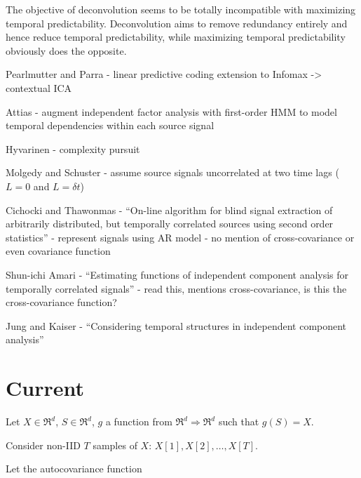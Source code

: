 \documentclass{article}
\begin{document}
  The objective of deconvolution seems to be totally incompatible with maximizing temporal predictability. Deconvolution aims to remove redundancy entirely and hence reduce temporal predictability, while maximizing temporal predictability obviously does the opposite.

  Pearlmutter and Parra - linear predictive coding extension to Infomax -> contextual ICA

  Attias - augment independent factor analysis with first-order HMM to model temporal dependencies within each source signal

  Hyvarinen - complexity pursuit

  Molgedy and Schuster - assume source signals uncorrelated at two time lags ($L=0$ and $L=\delta t$)

  Cichocki and Thawonmas - ``On-line algorithm for blind signal extraction of arbitrarily distributed, but temporally correlated sources using second order statistics'' - represent signals using AR model - no mention of cross-covariance or even covariance function

  Shun-ichi Amari - ``Estimating functions of independent component analysis for temporally correlated signals'' - read this, mentions cross-covariance, is this the cross-covariance function?

Jung and Kaiser - ``Considering temporal structures in independent component analysis''

  \section{Current}
  
  
  Let $X \in \mathfrak{R}^d$, $S \in \mathfrak{R}^d$, $g$ a function from $\mathfrak{R}^d \Rightarrow \mathfrak{R}^d$ such that $g(S) = X$.
  
  Consider non-IID $T$ samples of $X$: $X[1], X[2], \ldots, X[T]$.

  Let the autocovariance function

  
  
  
  
\end{document}
